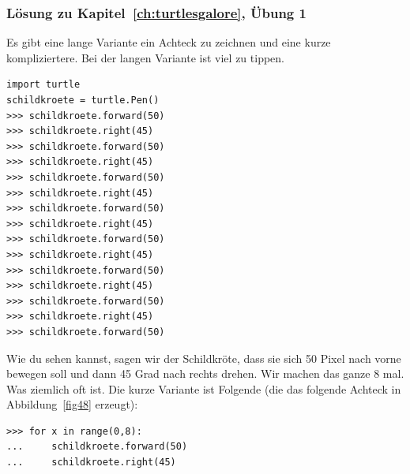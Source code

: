 \noindent
\subsubsection{Lösung zu Kapitel~\ref{ch:turtlesgalore}, Übung 1}
Es gibt eine lange Variante ein Achteck zu zeichnen und eine kurze kompliziertere. Bei der langen Variante ist viel zu tippen. 

\begin{Verbatim}[frame=single]
import turtle
schildkroete = turtle.Pen()
>>> schildkroete.forward(50)
>>> schildkroete.right(45)
>>> schildkroete.forward(50)
>>> schildkroete.right(45)
>>> schildkroete.forward(50)
>>> schildkroete.right(45)
>>> schildkroete.forward(50)
>>> schildkroete.right(45)
>>> schildkroete.forward(50)
>>> schildkroete.right(45)
>>> schildkroete.forward(50)
>>> schildkroete.right(45)
>>> schildkroete.forward(50)
>>> schildkroete.right(45)
>>> schildkroete.forward(50)
\end{Verbatim}

\noindent
Wie du sehen kannst, sagen wir der Schildkröte, dass sie sich 50 Pixel nach vorne bewegen soll und dann 45 Grad nach rechts drehen. Wir machen das ganze 8 mal. Was ziemlich oft ist. Die kurze Variante ist Folgende (die das folgende Achteck in Abbildung~\ref{fig48} erzeugt):

\begin{Verbatim}[frame=single]
>>> for x in range(0,8):
...     schildkroete.forward(50)
...     schildkroete.right(45)
\end{Verbatim}

